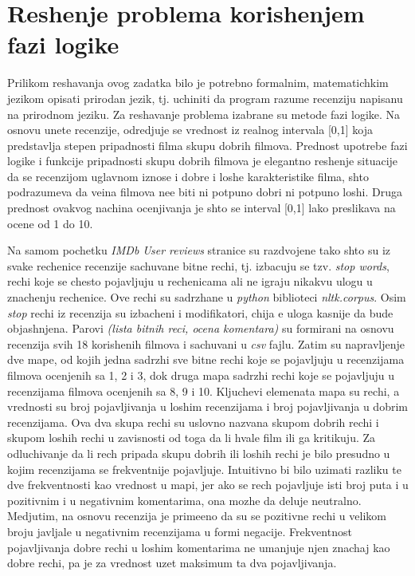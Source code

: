 \documentclass[cyr]{bibl}
\begin{document}
\pagebreak

\section{Reshenje problema korish\cc enjem fazi logike}
\begin{justify}

Prilikom reshavanja ovog zadatka bilo je potrebno formalnim, matematichkim jezikom opisati prirodan jezik, tj. uchiniti da program razume recenziju napisanu na prirodnom jeziku. Za reshavanje problema izabrane su metode fazi logike. Na osnovu unete recenzije, odredjuje se vrednost iz realnog intervala [0,1] koja predstavlja stepen pripadnosti filma skupu dobrih filmova. Prednost upotrebe fazi logike i funkcije pripadnosti skupu dobrih filmova je elegantno reshenje situacije da se recenzijom uglavnom iznose i dobre i loshe karakteristike filma, shto podrazumeva da ve\cc ina filmova ne\cc e biti ni potpuno dobri ni potpuno loshi. Druga prednost ovakvog nachina ocenjivanja je shto se interval [0,1] lako preslikava na ocene od 1 do 10.

Na samom pochetku \textit{\Lat IMDb User reviews} stranice su razdvojene tako shto su iz svake rechenice recenzije sachuvane bitne rechi, tj. izbacuju se tzv. \textit{\Lat stop words}, rechi koje se chesto pojavljuju u rechenicama ali ne igraju nikakvu ulogu u znachenju rechenice. Ove rechi su sadrzhane u \textit{\Lat python} biblioteci \textit{\Lat nltk.corpus}. Osim \textit{\Lat stop} rechi iz recenzija su izbacheni i modifikatori, chija \cc e uloga kasnije da bude objashnjena. Parovi \textit{\Lat (lista bitnih reci, ocena komentara)} su formirani na osnovu recenzija svih 18  korish\cc enih filmova i sachuvani u \textit{\Lat csv} fajlu. Zatim su napravljenje dve mape, od kojih jedna sadrzhi sve bitne rechi koje se pojavljuju u recenzijama filmova ocenjenih sa 1, 2 i 3, dok druga mapa sadrzhi rechi koje se pojavljuju u recenzijama filmova ocenjenih sa 8, 9 i 10. Kljuchevi elemenata mapa su rechi, a vrednosti su broj pojavljivanja u loshim recenzijama i broj pojavljivanja u dobrim recenzijama. Ova dva skupa rechi su uslovno nazvana skupom dobrih rechi i skupom loshih rechi u zavisnosti od toga da li hvale film ili ga kritikuju. Za odluchivanje da li rech pripada skupu dobrih ili loshih rechi je bilo presudno u kojim recenzijama se frekventnije pojavljuje. Intuitivno bi bilo uzimati razliku te dve frekventnosti kao vrednost u mapi, jer ako se rech pojavljuje isti broj puta i u pozitivnim i u negativnim komentarima, ona mozhe da deluje neutralno. Medjutim, na osnovu recenzija je prime\cc eno da su se pozitivne rechi u velikom broju javljale u negativnim recenzijama u formi negacije. Frekventnost pojavljivanja dobre rechi u loshim komentarima ne umanjuje njen znachaj kao dobre rechi, pa je za vrednost uzet maksimum ta dva pojavljivanja.


\end{justify}
\end{document}
